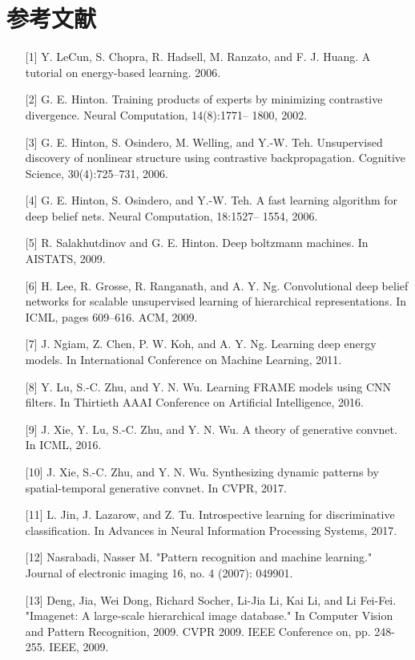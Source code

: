 \section{参考文献}


\begin{itemize}
	\item [{[}1{]}] Y. LeCun, S. Chopra, R. Hadsell, M. Ranzato, and F. J. Huang. A tutorial on energy-based learning. 2006.
	\item [{[}2{]}] G. E. Hinton. Training products of experts by minimizing contrastive divergence. Neural Computation, 14(8):1771– 1800, 2002.
	\item [{[}3{]}] G. E. Hinton, S. Osindero, M. Welling, and Y.-W. Teh. Unsupervised discovery of nonlinear structure using contrastive backpropagation. Cognitive Science, 30(4):725–731, 2006.
	\item [{[}4{]}] G. E. Hinton, S. Osindero, and Y.-W. Teh. A fast learning algorithm for deep belief nets. Neural Computation, 18:1527– 1554, 2006.
	\item [{[}5{]}] R. Salakhutdinov and G. E. Hinton. Deep boltzmann machines. In AISTATS, 2009.
	\item [{[}6{]}] H. Lee, R. Grosse, R. Ranganath, and A. Y. Ng. Convolutional deep belief networks for scalable unsupervised learning of hierarchical representations. In ICML, pages 609–616. ACM, 2009.
	\item [{[}7{]}] J. Ngiam, Z. Chen, P. W. Koh, and A. Y. Ng. Learning deep energy models. In International Conference on Machine Learning, 2011.
	\item [{[}8{]}] Y. Lu, S.-C. Zhu, and Y. N. Wu. Learning FRAME models using CNN filters. In Thirtieth AAAI Conference on Artificial Intelligence, 2016.
	\item [{[}9{]}] J. Xie, Y. Lu, S.-C. Zhu, and Y. N. Wu. A theory of generative convnet. In ICML, 2016.
	\item [{[}10{]}] J. Xie, S.-C. Zhu, and Y. N. Wu. Synthesizing dynamic patterns by spatial-temporal generative convnet. In CVPR, 2017.
	\item [{[}11{]}] L. Jin, J. Lazarow, and Z. Tu. Introspective learning for discriminative classification. In Advances in Neural Information Processing Systems, 2017.
	\item [{[}12{]}] Nasrabadi, Nasser M. "Pattern recognition and machine learning." Journal of electronic imaging 16, no. 4 (2007): 049901.
	\item [{[}13{]}] Deng, Jia, Wei Dong, Richard Socher, Li-Jia Li, Kai Li, and Li Fei-Fei. "Imagenet: A large-scale hierarchical image database." In Computer Vision and Pattern Recognition, 2009. CVPR 2009. IEEE Conference on, pp. 248-255. IEEE, 2009.

\end{itemize}
